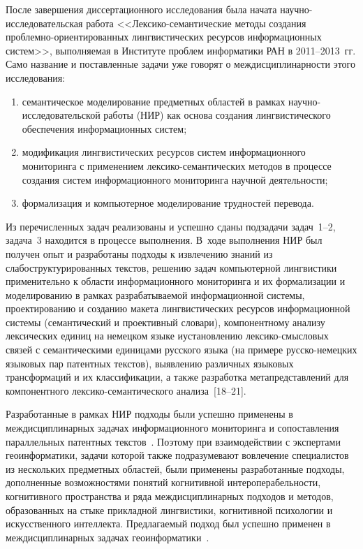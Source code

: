\begin{multicols}{2}
     
     После завершения диссертационного исследования была начата 
     на\-уч\-но-ис\-сле\-до\-ва\-тель\-ская работа 
     <<Лек\-си\-ко-се\-ман\-ти\-че\-ские методы создания 
     проблемно-ориентированных лингвистических ресурсов информационных систем>>, 
выполняемая в Институте проблем информатики РАН в 2011--2013~гг. Само 
название и поставленные задачи уже говорят о междисциплинарности этого 
исследования:
\columnbreak

\noindent
     \begin{enumerate}[(1)]
\item семантическое моделирование предметных областей в рамках 
научно-ис\-сле\-до\-ва\-тель\-ской работы (НИР) как основа создания лингвистического обеспечения 
информационных систем;
\item модификация лингвистических ресурсов сис\-тем 
информационного мониторинга с применением 
лек\-си\-ко-се\-ман\-ти\-че\-ских методов в процессе создания систем 
информационного мониторин\-га научной деятельности;
\item формализация и компьютерное моделирование трудностей 
перевода.
\end{enumerate}

     Из перечисленных задач реализованы и успешно сданы подзадачи 
задач~1--2, задача~3 находится в процессе выполнения. В~ходе выполнения 
НИР был получен опыт и разработаны подходы к извлечению знаний из 
слабоструктурированных текстов, решению задач компьютерной 
лингвистики применительно к области информационного мониторинга и их 
формализации и моделированию в рамках разрабатываемой 
информационной сис\-те\-мы, проектированию и созданию макета 
лингвистических ресурсов информационной сис\-те\-мы (семантический и 
проективный словари), компонентному анализу лексических единиц на 
немецком языке и\linebreak установлению лек\-си\-ко-смыс\-ло\-вых связей с 
семантическими единицами русского языка (на примере 
     рус\-ско-не\-мец\-ких языковых пар патентных \mbox{текстов}), выявлению 
различных языковых трансформаций и их классификации, а также 
разработка метапредставлений для компонентного 
     лек\-си\-ко-се\-ман\-ти\-че\-ско\-го анализа~[18--21].
     
     Разработанные в рамках НИР подходы были успешно применены в 
междисциплинарных задачах информационного мониторинга и 
со\-по\-став\-ле\-ния параллельных патентных текстов~\cite{21-ko, 22-ko}. Поэто\-му 
при взаимодействии с экспертами геоинформатики, задачи которой также 
подразумевают вовлечение специалистов из нескольких предметных 
областей, были применены разработанные подходы, дополненные 
возможностями понятий когнитивной интероперабельности, когнитивного 
пространства и ряда междисциплинарных подходов и методов, образованных 
на стыке прикладной лингвистики, когнитивной психологии и 
искусственного интеллекта. Предлагаемый подход был успешно применен в 
междисциплинарных задачах геоинформатики~\cite{23-ko}.
     

\end{multicols}
